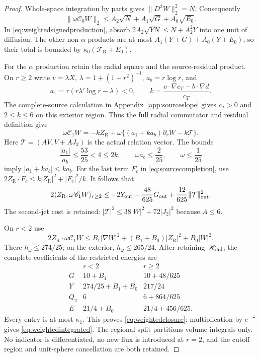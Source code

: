 \documentclass[11pt]{article}
\numberwithin{equation}{section}
\begin{document}
\begin{proof}
Whole-space integration by parts gives $\|D^2W\|_2^2=N$.
Consequently
\[
 \|\omega\mathscr C_0W\|_2
 \le A_2\sqrt N+A_1\sqrt G+A_0\sqrt{E_0}.
\]
In \eqref{eq:weightedsignedproduction}, absorb
$2A_2\sqrt{YN}\le N+A_2^2Y$ into one unit of diffusion.
The other non-$\alpha$ products are at most
$A_1(Y+G)+A_0(Y+E_0)$, so their total is bounded by
$\kappa_0(\mathcal F_{\mathrm R}+E_0)$.

For the $\alpha$ production retain the radial square and the
source-residual product. On $r\ge2$ write $v=\lambda X$,
$\lambda=1+(1+r^2)^{-1}$, $a_b=r\log r$, and
\[
 a_1=r(r\lambda'\log r-\lambda)<0,\qquad
 k=\frac{v\cdot\nabla c_T-b\cdot\nabla d}{c_T}.
\]
The complete-source calculation in Appendix~\ref{app:sourceslope}
gives $c_T>0$ and $2\le k\le6$ on this exterior region.
Thus the full radial commutator and residual definition give
\begin{equation}\label{eq:sourcecompletion}
 \omega\mathscr C_1W=-kZ_{\mathrm R}
       +\omega\{(a_1+ka_b)\partial_rW-k\mathcal T\}.
\end{equation}
Here $\mathcal T=(AV,V+AJ_2)$ is the actual relation vector.
The bounds
\[
 \frac{|a_1|}{a_b}\le\frac{53}{25}<4\le2k,\qquad
 \omega a_b\le\frac2{25},\qquad \omega\le\frac1{25}
\]
imply $|a_1+ka_b|\le ka_b$. For the last term $F_c$ in
\eqref{eq:sourcecompletion}, use
$2Z_{\mathrm R}\cdot F_c\le k|Z_{\mathrm R}|^2+|F_c|^2/k$.
It follows that
\begin{equation}\label{eq:sourceexteriorpayment}
 2\langle Z_{\mathrm R},\omega\mathscr C_1W\rangle_{r\ge2}
 \le-2Y_{\rm out}+\frac{48}{625}G_{\rm out}
                    +\frac{12}{625}\|\mathcal T\|_{\rm out}^2.
\end{equation}
The second-jet cost is retained:
$|\mathcal T|^2\le38|W|^2+72|J_2|^2$ because $A\le6$.

On $r<2$ use
\[
 2Z_{\mathrm R}\cdot\omega\mathscr C_1W
 \le B_1|\nabla W|^2+(B_1+B_0)|Z_{\mathrm R}|^2+B_0|W|^2.
\]
There $h_\omega\le274/25$; on the exterior,
$h_\omega\le265/24$. After retaining $\mathscr H_{\rm rad}$,
the complete coefficients of the restricted energies are
\[
\begin{array}{c|cc}
 &r<2&r\ge2\\ \hline
 G&10+B_1&10+48/625\\
 Y&274/25+B_1+B_0&217/24\\
 Q_2&6&6+864/625\\
 E&21/4+B_0&21/4+456/625.
\end{array}
\]
Every entry is at most $\kappa_1$. This proves
\eqref{eq:weightedclosure}; multiplication by $e^{-\Xi}$ gives
\eqref{eq:weightedintegrated}. The regional split partitions volume
integrals only. No indicator is differentiated, no new flux is
introduced at $r=2$, and the cutoff region and unit-sphere
cancellation are both retained.
\end{proof}
\end{document}
